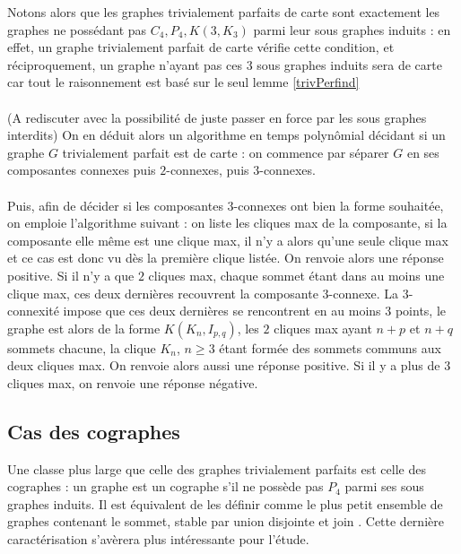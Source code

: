 \documentclass{scrartcl}
\begin{document}
\begin{flushleft}
Notons alors que les graphes trivialement parfaits de carte sont exactement les graphes ne possédant pas $C_4, P_4, K(3, K_3)$ parmi
leur sous graphes induits : en effet, un graphe trivialement parfait de carte vérifie cette condition, et réciproquement, un graphe
n'ayant pas ces $3$ sous graphes induits sera de carte car tout le raisonnement est basé sur le seul lemme \ref{trivPerfind}
\\~\\
(A rediscuter avec la possibilité de juste passer en force par les sous graphes interdits)
On en déduit alors un algorithme en temps polynômial décidant si un graphe $G$ trivialement parfait est de carte : on commence
par séparer $G$ en ses composantes connexes puis $2$-connexes, puis $3$-connexes.
\\~\\
Puis, afin de décider si les composantes $3$-connexes ont bien la forme souhaitée, on emploie l'algorithme suivant : on liste les cliques
max de la composante, si la composante elle même est une clique max, il n'y a alors qu'une seule clique max et ce cas est donc
vu dès la première clique listée. On renvoie alors une réponse positive. Si il n'y a que $2$ cliques max, chaque sommet étant
dans au moins une clique max, ces deux dernières recouvrent la composante $3$-connexe. La $3$-connexité impose que ces deux dernières
se rencontrent en au moins $3$ points, le graphe est alors de la forme $K(K_n, I_{p,q})$, les $2$ cliques max ayant $n+p$
et $n+q$ sommets chacune, la clique $K_n$, $n \geq 3$ étant formée des sommets communs aux deux cliques max. On renvoie alors
aussi une réponse positive. Si il y a plus de $3$ cliques max, on renvoie une réponse négative.

\subsection{Cas des cographes}

Une classe plus large que celle des graphes trivialement parfaits est celle des cographes : un graphe est un cographe s'il ne possède pas
$P_4$ parmi ses sous graphes induits. Il est équivalent de les définir comme le plus petit ensemble de graphes contenant le sommet, stable par
union disjointe et join \cite{cotrees}. Cette dernière caractérisation s'avèrera plus intéressante pour l'étude.\\


\end{flushleft}
\end{document}
